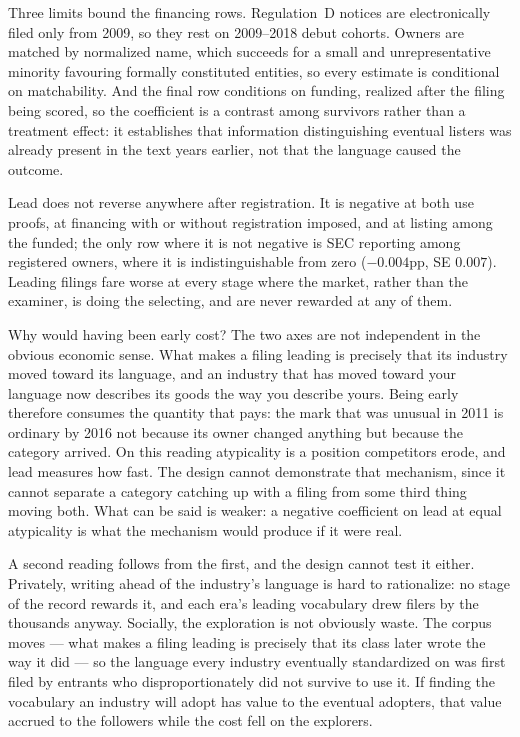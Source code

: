 Three limits bound the financing rows. Regulation~D notices are
electronically filed only from 2009, so they rest on 2009--2018 debut
cohorts. Owners are matched by normalized name, which succeeds for a
small and unrepresentative minority favouring formally constituted
entities, so every estimate is conditional on matchability. And the final
row conditions on funding, realized after the filing being scored, so the
coefficient is a contrast among survivors rather than a treatment effect:
it establishes that information distinguishing eventual listers was
already present in the text years earlier, not that the language caused
the outcome.

Lead does not reverse anywhere after registration. It is negative at both
use proofs, at financing with or without registration imposed, and at
listing among the funded; the only row where it is not negative is SEC
reporting among registered owners, where it is indistinguishable from
zero ($-0.004$pp, SE $0.007$). Leading filings fare worse at every stage
where the market, rather than the examiner, is doing the selecting, and
are never rewarded at any of them.

Why would having been early cost? The two axes are not independent in the
obvious economic sense. What makes a filing leading is precisely that its
industry moved toward its language, and an industry that has moved toward
your language now describes its goods the way you describe yours. Being
early therefore consumes the quantity that pays: the mark that was
unusual in 2011 is ordinary by 2016 not because its owner changed
anything but because the category arrived. On this reading atypicality is
a position competitors erode, and lead measures how fast. The design
cannot demonstrate that mechanism, since it cannot separate a category
catching up with a filing from some third thing moving both. What can be
said is weaker: a negative coefficient on lead at equal atypicality is
what the mechanism would produce if it were real.

A second reading follows from the first, and the design cannot test it
either. Privately, writing ahead of the industry's language is hard to
rationalize: no stage of the record rewards it, and each era's leading
vocabulary drew filers by the thousands anyway. Socially, the
exploration is not obviously waste. The corpus moves --- what makes a
filing leading is precisely that its class later wrote the way it did
--- so the language every industry eventually standardized on was first
filed by entrants who disproportionately did not survive to use it. If
finding the vocabulary an industry will adopt has value to the eventual
adopters, that value accrued to the followers while the cost fell on the
explorers.


